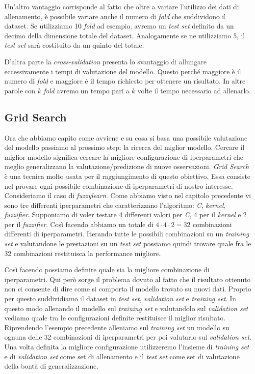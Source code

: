 \documentclass[12pt,italian]{report}
\begin{document}
Un'altro vantaggio corrisponde al fatto che oltre a variare l'utilizzo dei dati di allenamento, è possibile variare anche il numero di \emph{fold} che suddividono il dataset. Se utilizziamo 10 \emph{fold} ad esempio, avremo un \emph{test set} definito da un decimo della dimensione totale del dataset. Analogamente se ne utilizziamo 5, il \emph{test set} sarà costituito da un quinto del totale.

D'altra parte la \emph{cross-validation} presenta lo svantaggio di allungare eccessivamente i tempi di valutazione del modello. Questo perché maggiore è il numero di \emph{fold} e maggiore è il tempo richiesto per ottenere un risultato. In altre parole con $k$ \emph{fold} avremo un tempo pari a $k$ volte il tempo necessario ad allenarlo.

\subsection{Grid Search}
Ora che abbiamo capito come avviene e su cosa si basa una possibile valutazione del modello passiamo al prossimo step: la ricerca del miglior modello.
Cercare il miglior modello significa cercare la migliore configurazione di iperparametri che meglio generalizzano la valutazione/predizione di nuove osservazioni. 
\emph{Grid Search} è una tecnica molto usata per il raggiungimento di questo obiettivo. Essa consiste nel provare ogni possibile combinazione di iperparametri di nostro interesse. Consideriamo il caso di \emph{fuzzylearn}. Come abbiamo visto nel capitolo precedente vi sono tre differenti iperparametri che caratterizzano l'algoritmo: \emph{C}, \emph{kernel}, \emph{fuzzifier}. Supponiamo di voler testare 4 differenti valori per \emph{C}, 4 per il \emph{kernel} e 2 per il \emph{fuzzifier}. Così facendo abbiamo un totale di $4 \cdot 4 \cdot2 = 32$ combinazioni differenti di iperparametri.
Iterando tutte le possibili combinazioni su un \emph{training set} e valutandone le prestazioni su un \emph{test set} possiamo quindi trovare quale fra le 32 combinazioni restituisca la performance migliore.

Così facendo possiamo definire quale sia la migliore combinazione di iperparametri. Qui però sorge il problema dovuto al fatto che il risultato ottenuto non ci consente di dire come si comporta il modello trovato su nuovi dati. Proprio per questo suddividiamo il dataset in \emph{test set}, \emph{validation set} e \emph{training set}. In questo modo allenando il modello sul \emph{training set} e valutandolo sul \emph{validation set} vediamo quale tra le configurazioni definite restituisce il miglior risultato. Riprendendo l'esempio precedente alleniamo sul \emph{training set} un modello su ognuna delle 32 combinazioni di iperparametri per poi valutarlo sul \emph{validation set}. Una volta definita la migliore configurazione utilizzeremo l'insieme di \emph{training set} e di \emph{validation set} come set di allenamento e il \emph{test set} come set di valutazione della bontà di generalizzazione.
\end{document}
